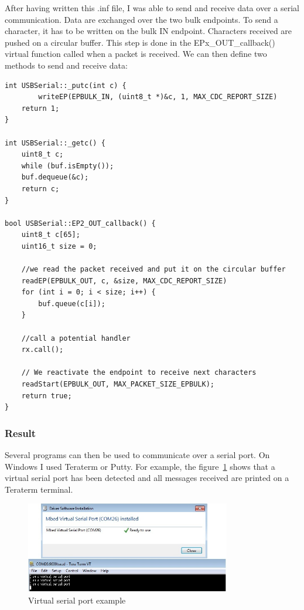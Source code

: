 \documentclass[pdftex,10pt,a4paper]{report}
\begin{document}
After having written this .inf file, I was able to send and receive data over a serial communication. Data are exchanged over the two bulk endpoints. To send a character, it has to be written  on the bulk IN endpoint. Characters received are pushed on a circular buffer. This step is done in the EPx\_OUT\_callback() virtual function called when a packet is received. We can then define two methods to send and receive data:

\begin{lstlisting}[label=USBSerial: putc and getc,caption=USBSerial: putc and getc]
int USBSerial::_putc(int c) {
		writeEP(EPBULK_IN, (uint8_t *)&c, 1, MAX_CDC_REPORT_SIZE)
    return 1;
}

int USBSerial::_getc() {
    uint8_t c;
    while (buf.isEmpty());
    buf.dequeue(&c);
    return c;
}

bool USBSerial::EP2_OUT_callback() {
    uint8_t c[65];
    uint16_t size = 0;

    //we read the packet received and put it on the circular buffer
    readEP(EPBULK_OUT, c, &size, MAX_CDC_REPORT_SIZE)
    for (int i = 0; i < size; i++) {
        buf.queue(c[i]);
    }

    //call a potential handler
    rx.call();

    // We reactivate the endpoint to receive next characters
    readStart(EPBULK_OUT, MAX_PACKET_SIZE_EPBULK);
    return true;
}
\end{lstlisting}

\subsubsection{Result}
Several programs can then be used to communicate over a serial port. On Windows I used Teraterm or Putty. For example, the figure~\ref{Virtual serial port example} shows that a virtual serial port has been detected and all messages received are printed on a Teraterm terminal.

\begin{figure}[h!]
		\centering
		\includegraphics[width=0.8\textwidth]{./serial_port_win.jpg}
		\caption{Virtual serial port example}
		\label{Virtual serial port example}
\end{figure}
\end{document}
